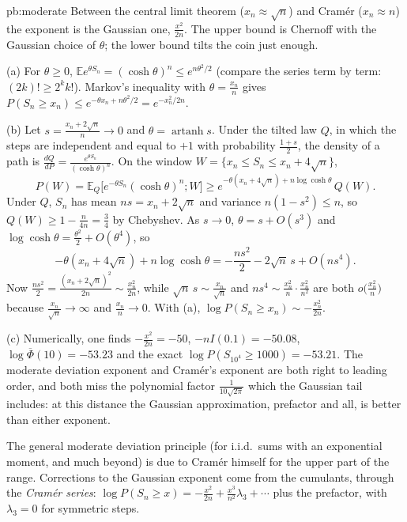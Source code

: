 \begin{solution}{pb:moderate}
\idea Between the central limit theorem ($x_n\approx\sqrt n$) and Cram\'er ($x_n\approx n$) the exponent is the Gaussian one, $\frac{x^2}{2n}$. The upper bound is
Chernoff with the Gaussian choice of $\theta$; the lower bound tilts the coin just enough.

\writeup (a) For $\theta\ge0$, $\mathbb Ee^{\theta S_n}=(\cosh\theta)^n\le e^{n\theta^2/2}$ (compare the series term by term: $(2k)!\ge2^kk!$). Markov's inequality with
$\theta=\frac{x_n}n$ gives $P(S_n\ge x_n)\le e^{-\theta x_n+n\theta^2/2}=e^{-x_n^2/2n}$.

(b) Let $s=\frac{x_n+2\sqrt n}n\to0$ and $\theta=\operatorname{artanh}s$. Under the tilted law $Q$, in which the steps are independent and equal to $+1$ with probability
$\frac{1+s}2$, the density of a path is $\frac{dQ}{dP}=\frac{e^{\theta S_n}}{(\cosh\theta)^n}$. On the window $W=\{x_n\le S_n\le x_n+4\sqrt n\}$,
\[
P(W)=\mathbb E_Q\bigl[e^{-\theta S_n}(\cosh\theta)^n;W\bigr]\ge e^{-\theta(x_n+4\sqrt n)+n\log\cosh\theta}\,Q(W).
\]
Under $Q$, $S_n$ has mean $ns=x_n+2\sqrt n$ and variance $n(1-s^2)\le n$, so $Q(W)\ge1-\frac n{4n}=\frac34$ by Chebyshev. As $s\to0$, $\theta=s+O(s^3)$ and
$\log\cosh\theta=\frac{\theta^2}2+O(\theta^4)$, so
\[
-\theta(x_n+4\sqrt n)+n\log\cosh\theta=-\frac{ns^2}2-2\sqrt n\,s+O(ns^4).
\]
Now $\frac{ns^2}2=\frac{(x_n+2\sqrt n)^2}{2n}\sim\frac{x_n^2}{2n}$, while $\sqrt n\,s\sim\frac{x_n}{\sqrt n}$ and $ns^4\sim\frac{x_n^2}n\cdot\frac{x_n^2}{n^2}$ are both $o\bigl(\frac{x_n^2}n\bigr)$ because
$\frac{x_n}{\sqrt n}\to\infty$ and $\frac{x_n}n\to0$. With (a), $\log P(S_n\ge x_n)\sim-\frac{x_n^2}{2n}$.

(c) Numerically, one finds $-\frac{x^2}{2n}=-50$, $-nI(0.1)=-50.08$, $\log\overline\Phi(10)=-53.23$ and the exact $\log P(S_{10^4}\ge1000)=-53.21$. The moderate deviation
exponent and Cram\'er's exponent are both right to leading order, and both miss the polynomial factor $\frac1{10\sqrt{2\pi}}$ which the Gaussian tail includes: at this
distance the Gaussian approximation, prefactor and all, is better than either exponent.

\leads The general moderate deviation principle (for i.i.d.\ sums with an exponential moment, and much beyond) is due to Cram\'er himself for the upper part of the range.
Corrections to the Gaussian exponent come from the cumulants, through the \emph{Cram\'er series}: $\log P(S_n\ge x)=-\frac{x^2}{2n}+\frac{x^3}{n^2}\lambda_3+\cdots$ plus the
prefactor, with $\lambda_3=0$ for symmetric steps.
\end{solution}

